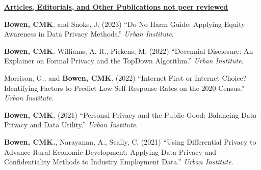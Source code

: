 \vspace{4pt}
\noindent\underline{\textbf{Articles, Editorials, and Other Publications not peer reviewed}}
\vspace{4pt}
\begin{etaremune}[topsep=0pt, itemsep=2pt, partopsep=0pt, parsep=0pt]
    \item \textbf{Bowen, CMK}. and Snoke, J. (2023) ``Do No Harm Guide: Applying Equity Awareness in Data Privacy Methods.'' \textit{Urban Institute}.

    \item \textbf{Bowen, CMK}. Williams, A. R., Pickens, M. (2022) ``Decennial Disclosure: An Explainer on Formal Privacy and the TopDown Algorithm.'' \textit{Urban Institute}.
    
    \item Morrison, G., and \textbf{Bowen, CMK}. (2022) ``Internet First or Internet Choice? Identifying Factors to Predict Low Self-Response Rates on the 2020 Census.'' \textit{Urban Institute}.
        
    \item \textbf{Bowen, CMK.} (2021) ``Personal Privacy and the Public Good: Balancing Data Privacy and Data Utility.'' \textit{Urban Institute}.
    
    \item \textbf{Bowen, CMK.}, Narayanan, A., Scally, C. (2021) ``Using Differential Privacy to Advance Rural Economic Development: Applying Data Privacy and Confidentiality Methods to Industry Employment Data.'' \textit{Urban Institute}.
\end{etaremune}